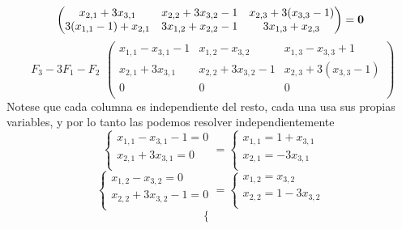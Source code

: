 \documentclass[../practica.root.tex]{subfiles}
\begin{document}
\begin{enumerate}
\[\begin{pmatrix}
                  x_{2,1} + 3x_{3,1}       & x_{2,2} + 3x_{3,2} - 1 & x_{2,3} + 3(x_{3,3} - 1) \\
                  3(x_{1,1} - 1) + x_{2,1} & 3x_{1,2} + x_{2,2} - 1 & 3x_{1,3} + x_{2,3}       \\
              \end{pmatrix}
              =
              \mathbf{0}
          \] \[
              \begin{array}{rl}
                  F_3-3F_1-F_2
              \end{array}
              \begin{pmatrix}
                  x_{1,1} - x_{3,1} - 1 & x_{1,2} - x_{3,2}      & x_{1,3} - x_{3,3} + 1    \\
                  x_{2,1} + 3x_{3,1}    & x_{2,2} + 3x_{3,2} - 1 & x_{2,3} + 3(x_{3,3} - 1) \\
                  0                     & 0                      & 0                        \\
              \end{pmatrix}
          \]
          Notese que cada columna es independiente del resto, cada una usa sus propias variables, y por lo tanto las podemos resolver independientemente
          \[
              \begin{cases}
                  x_{1,1} - x_{3,1} - 1 = 0 \\
                  x_{2,1} + 3x_{3,1} = 0    \\
              \end{cases}
              =
              \begin{cases}
                  x_{1,1} = 1 + x_{3,1} \\
                  x_{2,1} = -3x_{3,1}   \\
              \end{cases}
          \] \[
              \begin{cases}
                  x_{1,2} - x_{3,2} = 0      \\
                  x_{2,2} + 3x_{3,2} - 1 = 0 \\
              \end{cases}
              =
              \begin{cases}
                  x_{1,2} = x_{3,2}      \\
                  x_{2,2} = 1 - 3x_{3,2} \\
              \end{cases}
          \] \[
              \begin{cases}

\end{cases}\]
\end{enumerate}
\end{document}
